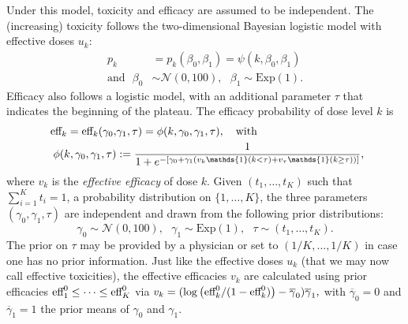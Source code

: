 Under this model, toxicity and efficacy are assumed to be independent. The (increasing) toxicity follows the two-dimensional Bayesian logistic model with effective doses $u_k$:  
\begin{align*}
p_k &= p_k(\beta_0,\beta_1) = \psi(k,\beta_0,\beta_1) 
\\
\text{and} \ \ \ \beta_0 &\sim \mathcal{N}(0,100), \ \ \ \beta_1 \sim \text{Exp}(1).
\end{align*}
Efficacy also follows a logistic model, with an additional parameter $\tau$ that indicates the beginning of the plateau. The efficacy probability of dose level $k$ is
\begin{align}\label{toxEff-model}
\eff_k = \eff_k(\gamma_0,&\gamma_1,\tau) = \phi(k,\gamma_0,\gamma_1,\tau), \ \ \
\text{with}
\\ \nonumber
	 \ \ \phi(k,\gamma_0,\gamma_1,\tau) &:= \frac{1}{1 + e^{-\left[\gamma_0 + \gamma_1(
    v_k \mathds{1}(k<\tau) + v_{\tau} \mathds{1}(k\ge\tau) )\right]}},
\end{align}
where $v_k$ is the \emph{effective efficacy} of dose $k$. Given $(t_1,\dots,t_K)$ such that $\sum_{i=1}^K t_i = 1$, a probability distribution on $\{1,\dots,K\}$, the three parameters $(\gamma_0,\gamma_1,\tau)$ are independent and drawn from the following prior distributions:     
\[\gamma_0 \sim \mathcal{N}(0,100), \ \ \ \gamma_1 \sim \text{Exp}(1), \ \ \  \tau  \sim (t_1,\dots,t_K).\]
The prior on $\tau$ may be provided by a physician or set to $(1/K,\dots,1/K)$ in case one has no prior information. Just like the effective doses $u_k$ (that we may now call effective toxicities), the effective efficacies $v_k$ are calculated using prior efficacies $\text{eff}^0_1 \leq \dots \leq \text{eff}^0_K$ via $
v_k = ( \log\left({ \text{eff}^0_k }/({1 - \text{eff}^0_k}) \right)
    - \overline{\gamma}_0)  \overline{\gamma}_1,
$ with $\overline{\gamma}_0 = 0$ and $\overline{\gamma}_1 = 1$ the prior means of $\gamma_0$ and $\gamma_1$. 

